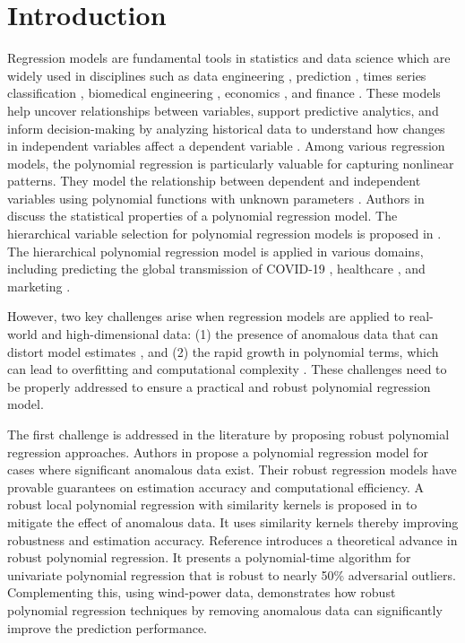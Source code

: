 \documentclass[smallextended,referee,envcountsect,,numbers]{svjour3}
\begin{document}
\maketitle

\section{Introduction}
Regression models are fundamental tools in statistics and data science which are widely used in disciplines such as data engineering \cite{bertsimas2025slowly}, prediction \cite{bertsimas2020novel}, times series classification \cite{guijo2024unsupervised}, biomedical engineering \cite{hashemi2021efficient}, economics \cite{karakatsani2008forecasting}, and finance \cite{liu2021leveraging}. These models help uncover relationships between variables, support predictive analytics, and inform decision-making by analyzing historical data to understand how changes in independent variables affect a dependent variable \cite{james2021introduction}. Among various regression models, the polynomial regression is particularly valuable for capturing nonlinear patterns. They model the relationship between dependent and independent variables using polynomial functions with unknown parameters \cite{bridgman2025novel}. Authors in  \cite{bertsimas2020sparseS} discuss the statistical properties of a polynomial regression model. The hierarchical variable selection for polynomial regression models is proposed in \cite{bertsimas2020sparse}. The hierarchical polynomial regression model is applied in various domains, including predicting the global transmission of COVID-19 \cite{ekum2020application}, healthcare \cite{west2020necessity}, and marketing \cite{niu2025role}.

However, two key challenges arise when regression models are applied to real-world and high-dimensional data: (1) the presence of anomalous data that can distort model estimates \cite{filzmoser2021robust}, and (2) the rapid growth in polynomial terms, which can lead to overfitting and computational complexity \cite{bottmer2022sparse}. These challenges need to be properly addressed to ensure a practical and robust polynomial regression model. 

The first challenge is addressed in the literature by proposing robust polynomial regression approaches. Authors in \cite{arora2024robust} propose a polynomial regression model for cases where significant anomalous data exist. Their robust regression models have provable guarantees on estimation accuracy and computational efficiency. A robust local polynomial regression with similarity kernels is proposed in \cite{shulman2025robust} to mitigate the effect of anomalous data. It uses similarity kernels thereby improving robustness and estimation accuracy. Reference \cite{kane2017robust} introduces a theoretical advance in robust polynomial regression. It presents a polynomial-time algorithm for univariate polynomial regression that is robust to nearly 50\% adversarial outliers. Complementing this, \cite{zhang2025wind} using wind-power data, demonstrates how robust polynomial regression techniques by removing anomalous data can significantly improve the prediction performance. 
\end{document}
